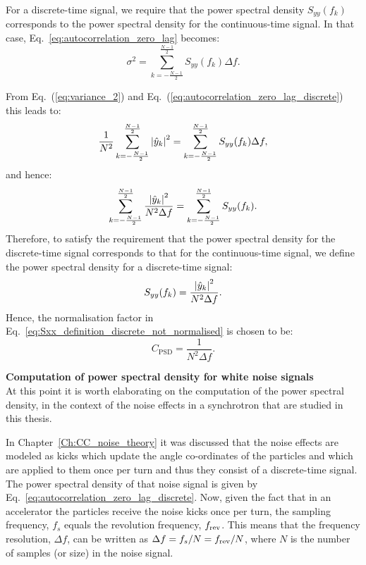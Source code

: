 For a discrete-time signal, we require that the power spectral density $S_{yy}(f_k)$ corresponds to the power spectral density for the continuous-time signal. In that case, Eq.~\eqref{eq:autocorrelation_zero_lag}
becomes:
\begin{equation}\label{eq:autocorrelation_zero_lag_discrete}
\sigma^2 =  \sum_{k=-\frac{N-1}{2}}^{\frac{N-1}{2}} S_{yy}(f_k) \Delta f.
\end{equation}

From Eq.~(\ref{eq:variance_2}) and Eq.~(\ref{eq:autocorrelation_zero_lag_discrete}) this leads to:
\begin{equation}\label{eq:normalisation_test}
 \frac{1}{N^2}\sum_{k=-\frac{N-1}{2}}^{\frac{N-1}{2}} \left | \hat{y}_k \right |^2 =  \sum_{k=-\frac{N-1}{2}}^{\frac{N-1}{2}} S_{yy}(f_k) \Delta f,
\end{equation} %
and hence:
\begin{equation}
  \sum_{k=-\frac{N-1}{2}}^{\frac{N-1}{2}} \frac{\left | \hat{y}_k \right |^2}{N^2 \Delta f} =  \sum_{k=-\frac{N-1}{2}}^{\frac{N-1}{2}} S_{yy}(f_k).
\end{equation}
Therefore, to satisfy the requirement that the power spectral density for the discrete-time signal corresponds to that for the continuous-time signal, we define the power spectral density for a discrete-time signal:
\begin{equation}
    S_{yy}(f_k) = \frac{\left | \hat{y}_k \right |^2}{N^2 \Delta f}.
\end{equation}
Hence, the normalisation factor in Eq.~\eqref{eq:Sxx_definition_discrete_not_normalised} is chosen to be:
\begin{equation}
    C_\mathrm{PSD}=\frac{1}{N^2 \Delta f}.
\end{equation}

\textbf{Computation of power spectral density for white noise signals}\\
At this point it is worth elaborating on the computation of the power spectral density, in the context of the noise effects in a synchrotron that are studied in this thesis.

In Chapter~\ref{Ch:CC_noise_theory} it was discussed that the noise effects are modeled as kicks which update the angle co-ordinates of the particles and which are applied to them once per turn and thus they consist of a discrete-time signal. The power spectral density of that noise signal is given by Eq.~\eqref{eq:autocorrelation_zero_lag_discrete}.  Now, given the fact that in an accelerator the particles receive the noise kicks once per turn, the sampling frequency, $f_s$ equals the revolution frequency, ${f_\mathrm{rev}}$. This means that the frequency resolution, $\Delta f$, can be written as $\Delta f = f_s/N = {f_\mathrm{rev}}/N$, where $N$ is the number of samples (or size) in the noise signal. 

